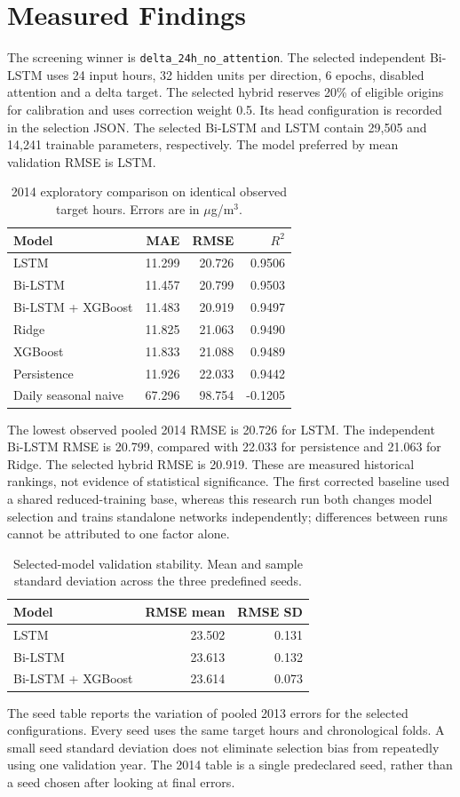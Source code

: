 \documentclass[conference]{IEEEtran}
\begin{document}
\section{Measured Findings}
The screening winner is \texttt{delta\_24h\_no\_attention}. The selected independent Bi-LSTM uses 24 input hours, 32 hidden units per direction, 6 epochs, disabled attention and a delta target. The selected hybrid reserves 20\% of eligible origins for calibration and uses correction weight 0.5. Its head configuration is recorded in the selection JSON. The selected Bi-LSTM and LSTM contain 29,505 and 14,241 trainable parameters, respectively. The model preferred by mean validation RMSE is LSTM.
\begin{table}[t]\centering
\caption{2014 exploratory comparison on identical observed target hours. Errors are in $\mu$g/m$^3$.}
\begin{tabular}{lrrr}\toprule
Model & MAE & RMSE & $R^2$\\\midrule
LSTM & 11.299 & 20.726 & 0.9506 \\
Bi-LSTM & 11.457 & 20.799 & 0.9503 \\
Bi-LSTM + XGBoost & 11.483 & 20.919 & 0.9497 \\
Ridge & 11.825 & 21.063 & 0.9490 \\
XGBoost & 11.833 & 21.088 & 0.9489 \\
Persistence & 11.926 & 22.033 & 0.9442 \\
Daily seasonal naive & 67.296 & 98.754 & -0.1205 \\
\bottomrule\end{tabular}\end{table}
The lowest observed pooled 2014 RMSE is 20.726 for LSTM. The independent Bi-LSTM RMSE is 20.799, compared with 22.033 for persistence and 21.063 for Ridge. The selected hybrid RMSE is 20.919. These are measured historical rankings, not evidence of statistical significance. The first corrected baseline used a shared reduced-training base, whereas this research run both changes model selection and trains standalone networks independently; differences between runs cannot be attributed to one factor alone.

\begin{table}[t]\centering
\caption{Selected-model validation stability. Mean and sample standard deviation across the three predefined seeds.}
\begin{tabular}{lrr}\toprule
Model & RMSE mean & RMSE SD\\\midrule
LSTM & 23.502 & 0.131 \\
Bi-LSTM & 23.613 & 0.132 \\
Bi-LSTM + XGBoost & 23.614 & 0.073 \\
\bottomrule\end{tabular}\end{table}
The seed table reports the variation of pooled 2013 errors for the selected configurations. Every seed uses the same target hours and chronological folds. A small seed standard deviation does not eliminate selection bias from repeatedly using one validation year. The 2014 table is a single predeclared seed, rather than a seed chosen after looking at final errors.
\end{document}
